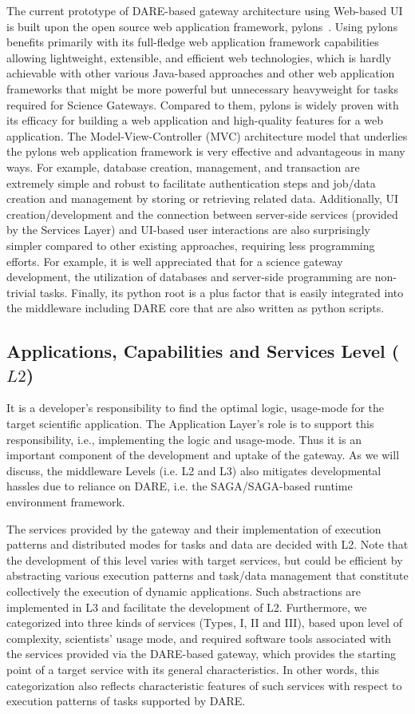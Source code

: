 \documentclass[]{svjour3}
\begin{document}
The current prototype of DARE-based gateway architecture using Web-based UI is built upon the open source web application 
framework, pylons~\cite{pylonsurl}. Using pylons benefits primarily with its full-fledge web application framework 
capabilities allowing lightweight, extensible, and efficient web technologies, which is hardly achievable with other 
various Java-based approaches and other web application frameworks that might be more powerful but unnecessary 
heavyweight for tasks required for Science Gateways. Compared to them, pylons is widely proven with its efficacy for 
building a web application and high-quality features for a web application. 
The Model-View-Controller (MVC) architecture model that underlies the
pylons web application framework \cite{pylonsurl} is very effective and advantageous in
many ways. For example, database creation, management, and transaction
are extremely simple and robust to facilitate authentication steps and
job/data creation and management by storing or retrieving related
data. Additionally, UI creation/development and the connection
between server-side services (provided by the Services Layer) and
UI-based user interactions are also surprisingly simpler compared to
other existing approaches, requiring less programming efforts. For
example, it is well appreciated that for a science gateway
development, the utilization of databases and server-side programming
are non-trivial tasks. Finally, its python root is a plus factor that is easily integrated into the middleware including DARE core that are also written as python scripts.


\subsection{Applications, Capabilities and Services Level ($L2$)}

It is a developer's responsibility to find the optimal logic,
usage-mode for the target scientific application. The Application
Layer's role is to support this responsibility, i.e., implementing the
logic and usage-mode. Thus it is an important component of the
development and uptake of the gateway. As we will discuss, the
middleware Levels (i.e. L2 and L3) also mitigates developmental
hassles due to reliance on DARE, i.e. the SAGA/SAGA-based runtime environment framework.

The services provided by the gateway and their implementation of execution patterns and distributed modes for tasks and 
data are decided with L2. Note that the development of this level varies with target services, but could be efficient by 
abstracting various execution patterns and task/data management that constitute collectively the execution of dynamic 
applications. Such abstractions are implemented in L3 and facilitate the development of L2. Furthermore, we categorized 
into three kinds of services (Types, I, II and III), based upon level of complexity, scientists' usage mode,
and required software tools associated with the services provided via the DARE-based gateway, which provides the starting 
point of a target service with its general characteristics. In other words, this categorization also reflects 
characteristic features of such services with respect to execution patterns of tasks supported by DARE.
\end{document}

